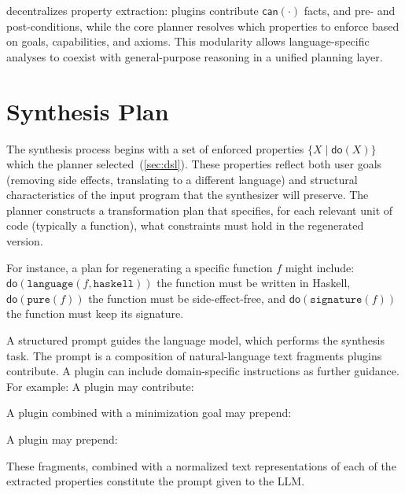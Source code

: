 \documentclass[a4paper,twoside,12pt]{report} %
\begin{document}
\sys decentralizes property extraction: plugins contribute $\mathsf{can}(\cdot)$ facts, and pre- and post-conditions, while the core planner resolves which properties to enforce based on goals, capabilities, and axioms.
This modularity allows language-specific analyses to coexist with general-purpose reasoning in a unified planning layer.

\chapter{Synthesis Plan}
\label{sec:synthesis}

The synthesis process begins with a set of enforced properties $\{ X \mid \mathsf{do}(X) \}$
which the planner selected~(\cref{sec:dsl}).
These properties
reflect both user goals (\eg removing side effects, translating to a
different language) and structural characteristics of the input program that
the synthesizer will preserve.
The planner constructs a transformation plan that
specifies, for each relevant unit of code (typically a function), what
constraints must hold in the regenerated version.

For instance, a plan for regenerating a specific function $f$ might include:
\(\mathsf{do}(\texttt{language}(f, \texttt{haskell}))\) the function must be written in Haskell, 
\(\mathsf{do}(\texttt{pure}(f))\) the function must be side-effect-free, and 
\(\mathsf{do}(\texttt{signature}(f))\) the function must keep its signature.

A structured prompt guides the language model, which performs the synthesis task.
The prompt is a composition of natural-language text fragments plugins contribute. 
A plugin can include domain-specific instructions as further guidance.
For example:
A  plugin may contribute:

A  plugin combined with a minimization goal may prepend:

A  plugin may prepend:


These fragments, combined with a normalized text representations of each of 
the extracted properties constitute the prompt given to the LLM.
\end{document}
